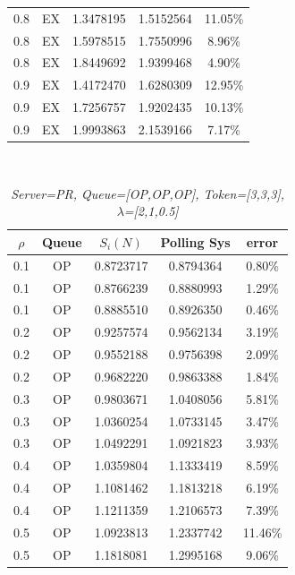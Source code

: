 \documentclass[12pt,a4paper,italian]{article}
\begin{document}
\begin{table}[ht!]
\begin{minipage}[b]{0.48\linewidth}
\begin{tabular}{c c c c c}
			 0.8 & EX & 1.3478195 &   1.5152564    & 11.05\% \\
			 0.8 & EX & 1.5978515 &   1.7550996    & 8.96\%  \\
			 0.8 & EX & 1.8449692 &   1.9399468    & 4.90\%  \\ \hline \hline
			 0.9 & EX & 1.4172470 &   1.6280309    & 12.95\% \\
			 0.9 & EX & 1.7256757 &   1.9202435    & 10.13\% \\
			 0.9 & EX & 1.9993863 &   2.1539166    & 7.17\%  \\\hline
			
			
		\end{tabular}
		
	\end{minipage}
\end{table}
\ \ \
\begin{table}[ht!]
	\begin{minipage}[b]{0.48\linewidth}\centering
		\centering
		\caption{\scriptsize \emph{Server=PR, Queue=[OP,OP,OP], Token=[3,3,3], $\lambda$=[2,1,0.5] }}
		\label{tab11}
		\tiny
		\begin{tabular}{c c c c c}
			\hline
			$\rho$ & Queue & $S_i(N)$ & Polling Sys & error \\ \hline
 0.1 & OP & 0.8723717 &   0.8794364    & 0.80\%  \\
 0.1 & OP & 0.8766239 &   0.8880993    & 1.29\%  \\
 0.1 & OP & 0.8885510 &   0.8926350    & 0.46\%  \\ \hline \hline
 0.2 & OP & 0.9257574 &   0.9562134    & 3.19\%  \\
 0.2 & OP & 0.9552188 &   0.9756398    & 2.09\%  \\
 0.2 & OP & 0.9682220 &   0.9863388    & 1.84\%  \\ \hline \hline
 0.3 & OP & 0.9803671 &   1.0408056    & 5.81\%  \\
 0.3 & OP & 1.0360254 &   1.0733145    & 3.47\%  \\
 0.3 & OP & 1.0492291 &   1.0921823    & 3.93\%  \\ \hline \hline
 0.4 & OP & 1.0359804 &   1.1333419    & 8.59\%  \\
 0.4 & OP & 1.1081462 &   1.1813218    & 6.19\%  \\
 0.4 & OP & 1.1211359 &   1.2106573    & 7.39\%  \\ \hline \hline
 0.5 & OP & 1.0923813 &   1.2337742    & 11.46\% \\
 0.5 & OP & 1.1818081 &   1.2995168    & 9.06\%  \\

\end{tabular}
\end{minipage}
\end{table}
\end{document}
